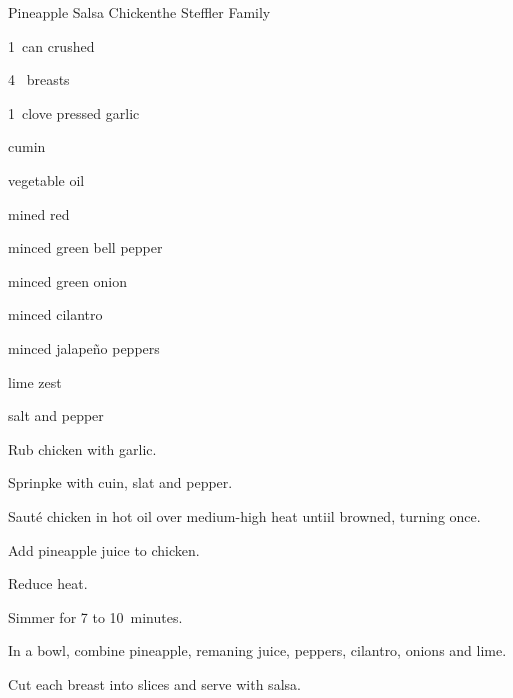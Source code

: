 \begin{recipe}{Pineapple Salsa Chicken}{the Steffler Family}{}

\begin{ingredients}
\item 1~can crushed 
\item 4~ breasts
\item 1~clove pressed garlic
\item {} cumin
\item {} vegetable oil
\item \C{\half} mined red 
\item \C{\quarter} minced green bell pepper
\item {} minced green onion
\item {} minced cilantro
\item {} minced jalape\~no peppers
\item {} lime zest
\item salt and pepper
\end{ingredients}

\begin{directions}
\item Rub chicken with garlic.
\item Sprinpke with cuin, slat and pepper.
\item Saut\'e chicken in hot oil over medium-high heat untiil browned, turning once.
\item Add \C{\half} pineapple juice to chicken.
\item Reduce heat.
\item Simmer for 7 to 10~minutes.
\item In a bowl, combine pineapple, remaning juice, peppers, cilantro, onions and lime.
\item Cut each breast into slices and serve with salsa.
\end{directions}
\end{recipe}
